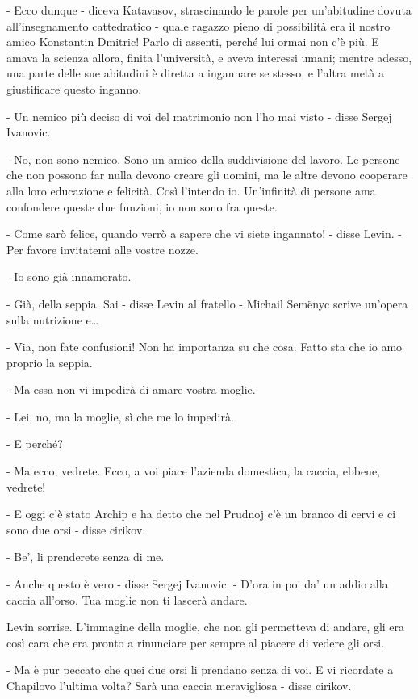 - Ecco dunque - diceva Katavasov, strascinando le parole per un'abitudine dovuta all'insegnamento cattedratico - quale ragazzo pieno di possibilità era il nostro amico Konstantin Dmitric! Parlo di assenti, perché lui ormai non c'è più. E amava la scienza allora, finita l'università, e aveva interessi umani; mentre adesso, una parte delle sue abitudini è diretta a ingannare se stesso, e l'altra metà a giustificare questo inganno. 

- Un nemico più deciso di voi del matrimonio non l'ho mai visto - disse Sergej Ivanovic. 

- No, non sono nemico. Sono un amico della suddivisione del lavoro. Le persone che non possono far nulla devono creare gli uomini, ma le altre devono cooperare alla loro educazione e felicità. Così l'intendo io. Un'infinità di persone ama confondere queste due funzioni, io non sono fra queste. 

- Come sarò felice, quando verrò a sapere che vi siete ingannato! - disse Levin. - Per favore invitatemi alle vostre nozze. 

- Io sono già innamorato. 

- Già, della seppia. Sai - disse Levin al fratello - Michail Semënyc scrive un'opera sulla nutrizione e\ldots{} 

- Via, non fate confusioni! Non ha importanza su che cosa. Fatto sta che io amo proprio la seppia. 

- Ma essa non vi impedirà di amare vostra moglie. 

- Lei, no, ma la moglie, sì che me lo impedirà. 

- E perché? 

- Ma ecco, vedrete. Ecco, a voi piace l'azienda domestica, la caccia, ebbene, vedrete! 

- E oggi c'è stato Archip e ha detto che nel Prudnoj c'è un branco di cervi e ci sono due orsi - disse cirikov. 

- Be', li prenderete senza di me. 

- Anche questo è vero - disse Sergej Ivanovic. - D'ora in poi da' un addio alla caccia all'orso. Tua moglie non ti lascerà andare. 

Levin sorrise. L'immagine della moglie, che non gli permetteva di andare, gli era così cara che era pronto a rinunciare per sempre al piacere di vedere gli orsi. 

- Ma è pur peccato che quei due orsi li prendano senza di voi. E vi ricordate a Chapilovo l'ultima volta? Sarà una caccia meravigliosa - disse cirikov. 

